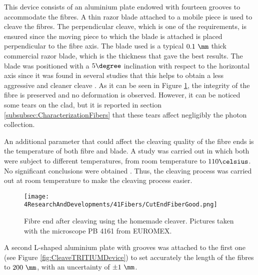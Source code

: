 This device consists of an aluminium plate endowed with fourteen grooves to accommodate the fibres. A thin razor blade attached to a mobile piece is used to cleave the fibres. The perpendicular cleave, which is one of the requirements, is ensured since the moving piece to which the blade is attached is placed perpendicular to the fibre axis. The blade used is a typical $0.1~\mm$ thick commercial razor blade, which is the thickness that gave the best results. The blade was positioned with a $5\degree$ inclination with respect to the horizontal axis since it was found in several studies that this helps to obtain a less aggressive and cleaner cleave \cite{AngleBlade, TemperatureBlade}. As it can be seen in Figure \ref{fig:CleavingFiberEnd}, the integrity of the fibre is preserved and no deformation is observed. However, it can be noticed some tears on the clad, but it is reported in section \ref{subsubsec:CharacterizationFibers} that these tears affect negligibly the photon collection. 

An additional parameter that could affect the cleaving quality of the fibre ends is the temperature of both fibre and blade. A study was carried out in which both were subject to different temperatures, from room temperature to $110\celsius$. No significant conclusions were obtained \cite{TFGAlberto}. Thus, the cleaving process was carried out at room temperature to make the cleaving process easier.

\begin{figure}[h]
\centering
\texttt{[image: 4ResearchAndDevelopments/41Fibers/CutEndFiberGood.png]}
\caption{Fibre end after cleaving using the homemade cleaver. Pictures taken with the microscope PB 4161 from EUROMEX.\label{fig:CleavingFiberEnd}}
\end{figure}

A second L-shaped aluminium plate with grooves was attached to the first one (see Figure \ref{fig:CleaveTRITIUMDevice}) to set accurately the length of the fibres to $200~\mm$, with an uncertainty of $\pm 1~\mm$.